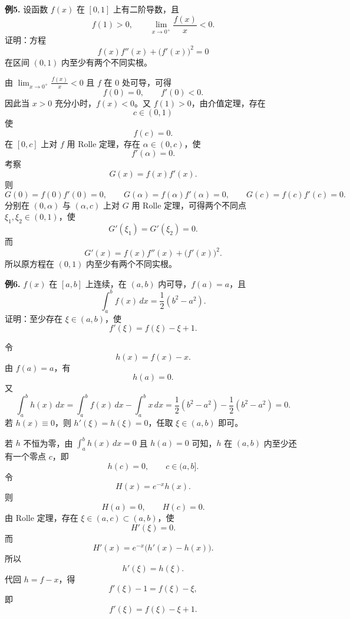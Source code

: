 \begin{problemblock}
\textbf{例5.} 设函数 \(f(x)\) 在 \([0,1]\) 上有二阶导数，且
\[
f(1)>0,\qquad \lim_{x\to0^+}\frac{f(x)}x<0.
\]
证明：方程
\[
f(x)f''(x)+\bigl(f'(x)\bigr)^2=0
\]
在区间 \((0,1)\) 内至少有两个不同实根。
\end{problemblock}
\begin{solutionblock}
由 \(\lim_{x\to0^+}\frac{f(x)}x<0\) 且 \(f\) 在 \(0\) 处可导，可得
\[
f(0)=0,\qquad f'(0)<0.
\]
因此当 \(x>0\) 充分小时，\(f(x)<0\)。又 \(f(1)>0\)，由介值定理，存在
\[
c\in(0,1)
\]
使
\[
f(c)=0.
\]
在 \([0,c]\) 上对 \(f\) 用 Rolle 定理，存在 \(\alpha\in(0,c)\)，使
\[
f'(\alpha)=0.
\]
考察
\[
G(x)=f(x)f'(x).
\]
则
\[
G(0)=f(0)f'(0)=0,\qquad
G(\alpha)=f(\alpha)f'(\alpha)=0,\qquad
G(c)=f(c)f'(c)=0.
\]
分别在 \((0,\alpha)\) 与 \((\alpha,c)\) 上对 \(G\) 用 Rolle 定理，可得两个不同点 \(\xi_1,\xi_2\in(0,1)\)，使
\[
G'(\xi_1)=G'(\xi_2)=0.
\]
而
\[
G'(x)=f(x)f''(x)+\bigl(f'(x)\bigr)^2.
\]
所以原方程在 \((0,1)\) 内至少有两个不同实根。
\end{solutionblock}

\begin{problemblock}
\textbf{例6.} \(f(x)\) 在 \([a,b]\) 上连续，在 \((a,b)\) 内可导，\(f(a)=a\)，且
\[
\int_a^b f(x)\,dx=\frac12(b^2-a^2).
\]
证明：至少存在 \(\xi\in(a,b)\)，使
\[
f'(\xi)=f(\xi)-\xi+1.
\]
\end{problemblock}
\begin{solutionblock}
令
\[
h(x)=f(x)-x.
\]
由 \(f(a)=a\)，有
\[
h(a)=0.
\]
又
\[
\int_a^b h(x)\,dx
=\int_a^b f(x)\,dx-\int_a^b x\,dx
=\frac12(b^2-a^2)-\frac12(b^2-a^2)=0.
\]
若 \(h(x)\equiv0\)，则 \(h'(\xi)=h(\xi)=0\)，任取 \(\xi\in(a,b)\) 即可。

若 \(h\) 不恒为零，由 \(\int_a^b h(x)\,dx=0\) 且 \(h(a)=0\) 可知，\(h\) 在 \((a,b)\) 内至少还有一个零点 \(c\)，即
\[
h(c)=0,\qquad c\in(a,b].
\]
令
\[
H(x)=e^{-x}h(x).
\]
则
\[
H(a)=0,\qquad H(c)=0.
\]
由 Rolle 定理，存在 \(\xi\in(a,c)\subset(a,b)\)，使
\[
H'(\xi)=0.
\]
而
\[
H'(x)=e^{-x}\bigl(h'(x)-h(x)\bigr).
\]
所以
\[
h'(\xi)=h(\xi).
\]
代回 \(h=f-x\)，得
\[
f'(\xi)-1=f(\xi)-\xi,
\]
即
\[
f'(\xi)=f(\xi)-\xi+1.
\]
\end{solutionblock}

